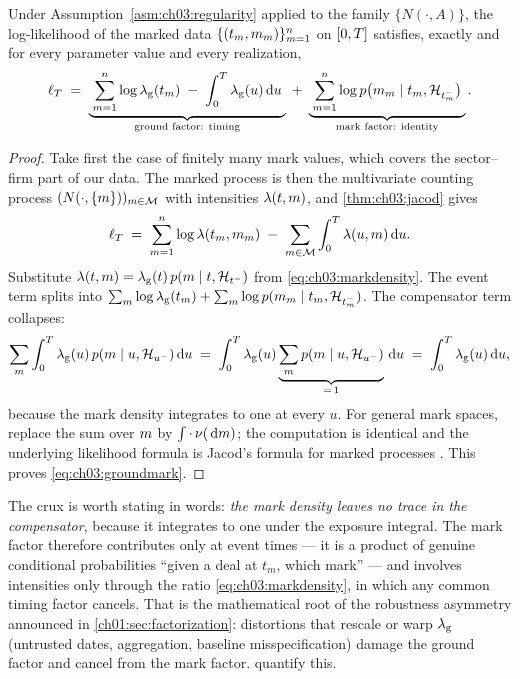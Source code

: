 \begin{theorem}\label{thm:ch03:groundmark}
Under Assumption~\ref{asm:ch03:regularity} applied to the family
$\{N(\cdot,A)\}$, the log-likelihood of the marked data
$\{(t_m,m_m)\}_{m=1}^{n}$ on $[0,T]$ satisfies, exactly and for
every parameter value and every realization,
\begin{equation}\label{eq:ch03:groundmark}
\ell_{T}
 \;=\;
 \underbrace{\;\sum_{m=1}^{n} \log \lambda_{\mathrm g}(t_m)
 \;-\; \int_0^{T} \lambda_{\mathrm g}(u)\,\mathrm{d} u\;}_{\text{ground factor: timing}}
 \;+\;
 \underbrace{\;\sum_{m=1}^{n} \log p\big(m_m \mid t_m, \mathcal{H}_{t_m^-}\big)\;}_{\text{mark factor: identity}} .
\end{equation}
\end{theorem}

\begin{proof}
Take first the case of finitely many mark values, which covers the
sector--firm part of our data. The marked process is then the multivariate
counting process $(N(\cdot,\{m\}))_{m\in\mathcal M}$ with
intensities $\lambda(t,m)$, and \cref{thm:ch03:jacod} gives
\[
\ell_{T}
 \;=\;
 \sum_{m=1}^{n} \log \lambda(t_m, m_m)
 \;-\;
 \sum_{m\in\mathcal M} \int_0^{T} \lambda(u,m)\,\mathrm{d} u .
\]
Substitute $\lambda(t,m) = \lambda_{\mathrm g}(t)\,
p(m\mid t,\mathcal{H}_{t^-})$ from \cref{eq:ch03:markdensity}. The event
term splits into $\sum_m \log\lambda_{\mathrm g}(t_m) + \sum_m \log
p(m_m \mid t_m, \mathcal{H}_{t_m^-})$. The compensator term collapses:
\[
\sum_{m} \int_0^{T} \lambda_{\mathrm g}(u)\,
 p(m \mid u, \mathcal{H}_{u^-})\,\mathrm{d} u
 \;=\;
 \int_0^{T} \lambda_{\mathrm g}(u)
 \underbrace{\sum_{m} p(m \mid u, \mathcal{H}_{u^-})}_{=\,1}\,\mathrm{d} u
 \;=\;
 \int_0^{T} \lambda_{\mathrm g}(u)\,\mathrm{d} u ,
\]
because the mark density integrates to one at every $u$. For general mark
spaces, replace the sum over $m$ by $\int \cdot\,\nu(\,\mathrm{d}m)$; the
computation is identical and the underlying likelihood formula is Jacod's
formula for marked processes \citep{daley2008}. This proves
\cref{eq:ch03:groundmark}.
\end{proof}

The crux is worth stating in words: \emph{the mark density leaves no trace
in the compensator}, because it integrates to one under the exposure
integral. The mark factor therefore contributes only at event times --- it
is a product of genuine conditional probabilities ``given a deal at $t_m$,
which mark'' --- and involves intensities only through the ratio
\cref{eq:ch03:markdensity}, in which any common timing factor cancels.
That is the mathematical root of the robustness asymmetry announced in
\cref{ch01:sec:factorization}: distortions that rescale or warp
$\lambda_{\mathrm g}$ (untrusted dates, aggregation, baseline
misspecification) damage the ground factor and cancel from the mark
factor.  quantify this.

